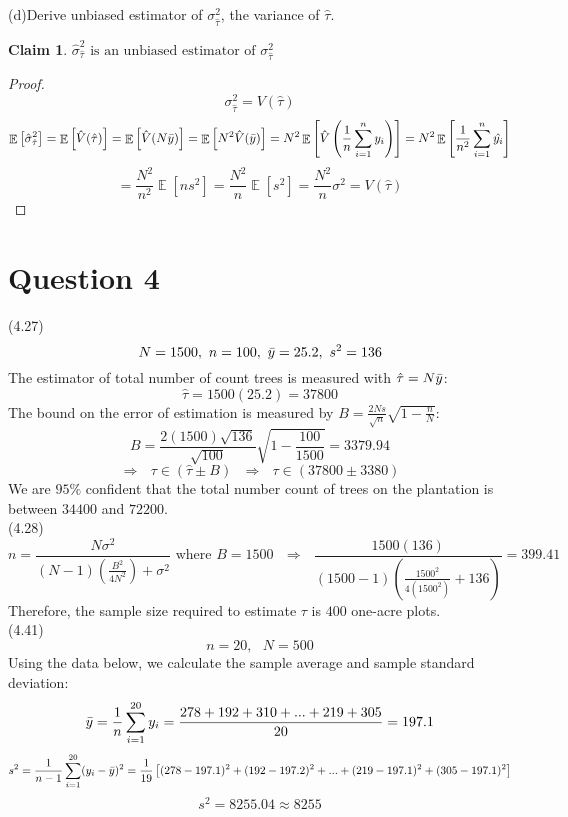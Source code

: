 \documentclass[11pt]{article}
\DeclareMathOperator*{\E}{\mathbb{E}}
\theoremstyle{claim}
\newtheorem*{claim}{Claim}
\begin{document}
\newpage
\noindent (d)Derive unbiased estimator of $\sigma^2_{\hat{\tau}}$, the variance of $\hat{\tau}$.
\begin{claim}
$\hat{\sigma}^2_{\hat{\tau}} \text{ is an unbiased estimator of } \sigma^2_{\hat{\tau}}$
\end{claim}
\begin{proof}
\[\sigma^2_{\hat{\tau}}=V(\hat{\tau})\]
\[\E\left[ \hat{\sigma}^2_{\hat{\tau}}\right]=\E\left[\hat{V}(\hat{\tau})\right]=\E\left[\hat{V}(N\Bar{y})\right]=\E\left[N^2\hat{V}(\Bar{y})\right]=N^2\E\left[\hat{V}\left(\frac{1}{n}\sum^n_{i=1}y_i\right)\right]=N^2\E\left[\frac{1}{n^2}\sum^n_{i=1}\hat{y_i}\right]\]
\[=\frac{N^2}{n^2}\E\left[ns^2\right]=\frac{N^2}{n}\E[s^2]=\frac{N^2}{n}\sigma^2=V(\hat{\tau})\]
\end{proof}
\newpage
\section*{Question 4}
(4.27)
\[N=1500,\text{   } n=100,\text{   } \Bar{y}=25.2,\text{   } s^2=136\]
The estimator of total number of count trees is measured with $\hat{\tau}=N\Bar{y}$:
\[\hat{\tau}=1500(25.2)=37800\]
The bound on the error of estimation is measured by $B=\frac{2Ns}{\sqrt{n}}\sqrt{1-\frac{n}{N}}$:
\[B=\frac{2(1500)\sqrt{136}}{\sqrt{100}}\sqrt{1-\frac{100}{1500}}=3379.94\]
\[\Rightarrow \text{ } \tau \in \left(\hat{\tau}\pm B\right)\text{ } \Rightarrow \text{ } \tau \in \left( 37800\pm 3380\right)\]
We are $95\%$ confident that the total number count of trees on the plantation is between $34400$ and $72200$.
\vspace{10mm}
\\(4.28)
\[n=\frac{N\sigma^2}{(N-1)(\frac{B^2}{4N^2})+\sigma^2} \text{ where $B=1500$ } \Rightarrow \text{ }\frac{1500(136)}{(1500-1)\left(\frac{1500^2}{4(1500^2)}+136\right)}=399.41\]
Therefore, the sample size required to estimate $\tau$ is $400$ one-acre plots.
\vspace{10mm}
\\(4.41)
\[n=20, \text{ } N=500\]
Using the data below, we calculate the sample average and sample standard deviation:
\[\Bar{y}=\frac{1}{n}\sum^{20}_{i=1}y_i=\frac{278+192+310+...+219+305}{20}=197.1\]
\[s^2=\frac{1}{n-1}\sum^{20}_{i=1}(y_i-\Bar{y})^2=\frac{1}{19}\left[(278-197.1)^2+(192-197.2)^2+...+(219-197.1)^2+(305-197.1)^2\right]\]
\[s^2=8255.04\approx 8255\]
\end{document}
